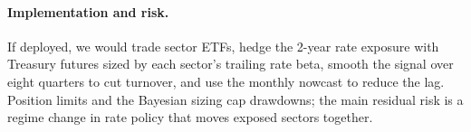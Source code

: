 \paragraph{Implementation and risk.} If deployed, we would trade sector ETFs, hedge the 2-year rate exposure with Treasury futures sized by each sector's trailing rate beta, smooth the signal over eight quarters to cut turnover, and use the monthly nowcast to reduce the lag. Position limits and the Bayesian sizing cap drawdowns; the main residual risk is a regime change in rate policy that moves exposed sectors together.

